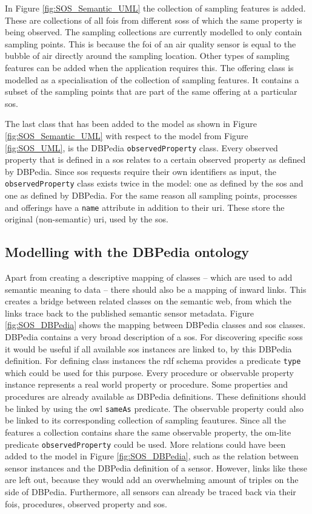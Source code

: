 In Figure \ref{fig:SOS_Semantic_UML} the collection of sampling features is added. These are collections of all \acp{foi} from different \aclp{sos} of which the same property is being observed. The sampling collections are currently modelled to only contain sampling points. This is because the \ac{foi} of an air quality sensor is equal to the bubble of air directly around the sampling location. Other types of sampling features can be added when the application requires this. The offering class is modelled as a specialisation of the collection of sampling features. It contains a subset of the sampling points that are part of the same offering at a particular \ac{sos}.

The last class that has been added to the model as shown in Figure \ref{fig:SOS_Semantic_UML} with respect to the model from Figure \ref{fig:SOS_UML}, is the DBPedia \texttt{observedProperty} class. Every observed property that is defined in a \ac{sos} relates to a certain observed property as defined by DBPedia. Since \ac{sos} requests require their own identifiers as input, the \texttt{observedProperty} class exists twice in the model: one as defined by the \ac{sos} and one as defined by DBPedia. For the same reason all sampling points, processes and offerings have a \texttt{name} attribute in addition to their \ac{uri}. These store the original (non-semantic) \ac{uri}, used by the \ac{sos}. 

\subsection{Modelling with the DBPedia ontology}
Apart from creating a descriptive mapping of classes -- which are used to add semantic meaning to data -- there should also be a mapping of inward links. This creates a bridge between related classes on the semantic web, from which the links trace back to the published semantic sensor metadata. Figure \ref{fig:SOS_DBPedia} shows the mapping between DBPedia classes and \ac{sos} classes. DBPedia contains a very broad description of a \ac{sos}. For discovering specific \aclp{sos} it would be useful if all available \ac{sos} instances are linked to, by this DBPedia definition. For defining class instances the \ac{rdf} schema provides a predicate \texttt{type} which could be used for this purpose. Every procedure or observable property instance represents a real world property or procedure. Some properties and procedures are already available as DBPedia definitions. These definitions should be linked by using the \ac{owl} \texttt{sameAs} predicate. The observable property could also be linked to its corresponding collection of sampling feautures. Since all the features a collection contains share the same observable property, the om-lite predicate \texttt{observedProperty} could be used. More relations could have been added to the model in Figure \ref{fig:SOS_DBPedia}, such as the relation between sensor instances and the DBPedia definition of a sensor. However, links like these are left out, because they would add an overwhelming amount of triples on the side of DBPedia. Furthermore, all sensors can already be traced back via their \acp{foi}, procedures, observed property and \ac{sos}. 
 
